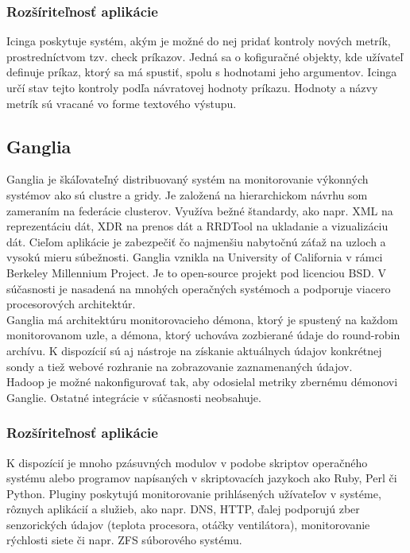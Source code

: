 \documentclass[11pt,final,oneside]{fithesis}
\begin{document}
\subsubsection{Rozšíriteľnosť aplikácie}
Icinga poskytuje systém, akým je možné do nej pridať kontroly nových metrík, prostredníctvom tzv. check príkazov. Jedná sa o kofiguračné objekty, kde užívateľ definuje príkaz,
ktorý sa má spustiť, spolu s hodnotami jeho argumentov. Icinga určí stav tejto kontroly podľa návratovej hodnoty príkazu.\cite{08} Hodnoty a názvy metrík sú vracané vo forme textového výstupu.

\subsection{Ganglia} 
Ganglia je škáľovateľný distribuovaný systém na monitorovanie výkonných systémov ako sú clustre a gridy. Je založená na hierarchickom návrhu 
som zameraním na federácie clusterov. Využíva bežné štandardy, ako napr. XML na reprezentáciu dát, XDR na prenos dát a RRDTool na
ukladanie a vizualizáciu dát.\cite{15} Cieľom aplikácie je zabezpečiť čo najmenšiu nabytočnú záťaž na uzloch a vysokú
mieru súbežnosti. Ganglia vznikla na University of California v rámci Berkeley Millennium Project. Je to open-source projekt
pod licenciou BSD. V súčasnosti je nasadená na mnohých operačných systémoch a podporuje viacero procesorových architektúr.
\\Ganglia má architektúru monitorovacieho démona, ktorý je spustený na každom monitorovanom uzle, a démona, ktorý uchováva zozbierané údaje do
round-robin archívu.
K dispozícií sú aj nástroje na získanie aktuálnych údajov konkrétnej sondy a tiež webové rozhranie na zobrazovanie zaznamenaných údajov.
\\Hadoop je možné nakonfigurovať tak, aby odosielal metriky zbernému démonovi Ganglie. Ostatné integrácie v súčasnosti neobsahuje.

\subsubsection{Rozšíriteľnosť aplikácie}
K dispozícií je mnoho pzásuvných modulov v podobe skriptov operačného systému alebo programov napísaných v skriptovacích jazykoch ako Ruby,
Perl či Python. Pluginy poskytujú monitorovanie prihlásených užívateľov v systéme, rôznych aplikácií a služieb, ako napr. DNS, HTTP, ďalej
podporujú zber senzorických údajov (teplota procesora, otáčky ventilátora), monitorovanie rýchlosti siete či napr. ZFS súborového systému.
\cite{16}
\end{document}
